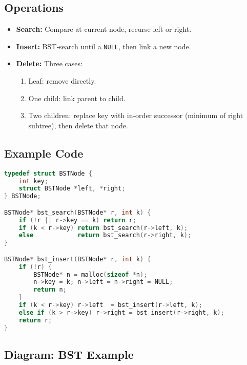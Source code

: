 \documentclass[12pt]{article}
\begin{document}
\subsection*{Operations}
\begin{itemize}
  \item \textbf{Search:} Compare at current node, recurse left or right.
  \item \textbf{Insert:} BST‑search until a \texttt{NULL}, then link a new node.
  \item \textbf{Delete:} Three cases:
    \begin{enumerate}
      \item Leaf: remove directly.
      \item One child: link parent to child.
      \item Two children: replace key with in‑order successor (minimum of right subtree), then delete that node.
    \end{enumerate}
\end{itemize}

\subsection*{Example Code}
\begin{lstlisting}[language=C]
typedef struct BSTNode {
    int key;
    struct BSTNode *left, *right;
} BSTNode;

BSTNode* bst_search(BSTNode* r, int k) {
    if (!r || r->key == k) return r;
    if (k < r->key) return bst_search(r->left, k);
    else            return bst_search(r->right, k);
}

BSTNode* bst_insert(BSTNode* r, int k) {
    if (!r) {
        BSTNode* n = malloc(sizeof *n);
        n->key = k; n->left = n->right = NULL;
        return n;
    }
    if (k < r->key) r->left  = bst_insert(r->left, k);
    else if (k > r->key) r->right = bst_insert(r->right, k);
    return r;
}
\end{lstlisting}

\subsection*{Diagram: BST Example}
\begin{center}
\end{center}
\end{document}
